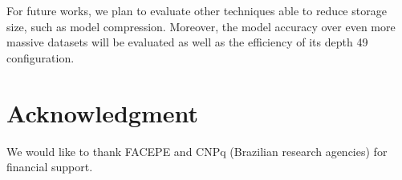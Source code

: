 \documentclass[conference]{IEEEtran}
\begin{document}
For future works, we plan to evaluate other techniques able to reduce storage size, such as model compression. Moreover, the model accuracy over even more massive datasets will be evaluated as well as the efficiency of its depth 49 configuration.

\section*{Acknowledgment}
We would like to thank FACEPE and CNPq (Brazilian research agencies) for financial support.





  
  
\end{document}
